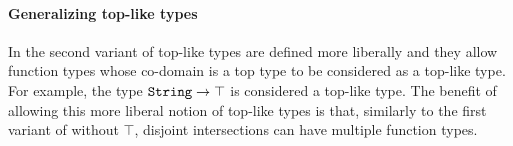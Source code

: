 \paragraph{Generalizing top-like types} In the second variant of \name 
top-like types are defined more liberally and they allow function types
whose co-domain is a top type to be considered as a top-like type.
For example, the type $\texttt{String}\to\top$ is considered a top-like
type. The benefit of allowing this more liberal notion of top-like
types is that, similarly to the first variant of \name without $\top$, 
disjoint intersections can have multiple function types. 





 


